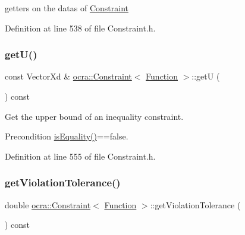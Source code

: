 getters on the datas of \hyperlink{classocra_1_1Constraint}{Constraint} 

Definition at line 538 of file Constraint.\+h.

\hypertarget{classocra_1_1Constraint_3_01Function_01_4_aec8febaea23e49d7166a1aeafbcb3f23}{}\label{classocra_1_1Constraint_3_01Function_01_4_aec8febaea23e49d7166a1aeafbcb3f23} 
\subsubsection{\texorpdfstring{get\+U()}{getU()}}
{\footnotesize\ttfamily const Vector\+Xd \& \hyperlink{classocra_1_1Constraint}{ocra\+::\+Constraint}$<$ \hyperlink{classocra_1_1Function}{Function} $>$\+::getU (\begin{DoxyParamCaption}{ }\end{DoxyParamCaption}) const\hspace{0.3cm}{\ttfamily [inline]}}

Get the upper bound of an inequality constraint.

\begin{DoxyPrecond}{Precondition}
\hyperlink{classocra_1_1Constraint_3_01Function_01_4_a3c7d085d888ef8937977129740d4c8a6}{is\+Equality()}==false. 
\end{DoxyPrecond}


Definition at line 555 of file Constraint.\+h.

\hypertarget{classocra_1_1Constraint_3_01Function_01_4_a72f3bc312073f4d431547261ff06387e}{}\label{classocra_1_1Constraint_3_01Function_01_4_a72f3bc312073f4d431547261ff06387e} 
\subsubsection{\texorpdfstring{get\+Violation\+Tolerance()}{getViolationTolerance()}}
{\footnotesize\ttfamily double \hyperlink{classocra_1_1Constraint}{ocra\+::\+Constraint}$<$ \hyperlink{classocra_1_1Function}{Function} $>$\+::get\+Violation\+Tolerance (\begin{DoxyParamCaption}{ }\end{DoxyParamCaption}) const\hspace{0.3cm}{\ttfamily [inline]}}



